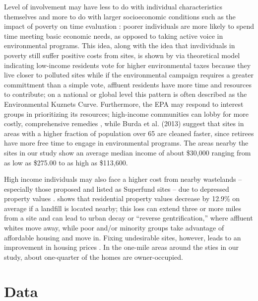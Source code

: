 \documentclass[12pt]{article}
\begin{document}
Level of involvement may have less to do with individual characteristics themselves and more to do with larger socioeconomic conditions such as the impact of poverty on time evaluation \parencite{dunlap1978new, Sigman2001}: poorer individuals are more likely to spend time meeting basic economic needs, as opposed to taking active voice in environmental programs. This idea, along with the idea that invdividuals in poverty still suffer positive costs from sites, is shown by \textcite{nakada_2017} via theoretical model indicating low-income residents vote for higher environmental taxes because they live closer to polluted sites while if the environmental campaign requires a greater committment than a simple vote, affluent residents have more time and resources to contribute; on a national or global level this pattern is often described as the Environmental Kuznets Curve. Furthermore, the EPA may respond to interest groups in prioritizing its resources; high-income communities can lobby for more costly, comprehensive remedies \parencite{Sigman2001, Gamper-Rabindran2013, burda2014environmental}, while {Burda et al. (2013) suggest that sites in areas with a higher fraction of population over 65 are cleaned faster, since retirees have more free time to engage in environmental programs.} The areas nearby the sites in our study show an average median income of about \$30,000 ranging from as low as \$275.00 to as high as \$113,600. 

High income individuals may also face a higher cost from nearby wastelands -- especially those proposed and listed as Superfund sites -- due to depressed property values \parencite{McClelland1990}. \textcite{ready2010landfills} shows that residential property values decrease by 12.9\% on average if a landfill is located nearby; this loss can extend three or more miles from a site and can lead to urban decay or ``reverse gentrification,'' where affluent whites move away, while poor and/or minority groups take advantage of affordable housing and move in. Fixing undesirable sites, however, leads to an improvement in housing prices \parencite{Haninger2017}. In the one-mile areas around the sties in our study, about one-quarter of the homes are owner-occupied.


\section{Data}\label{data}

\end{document}

